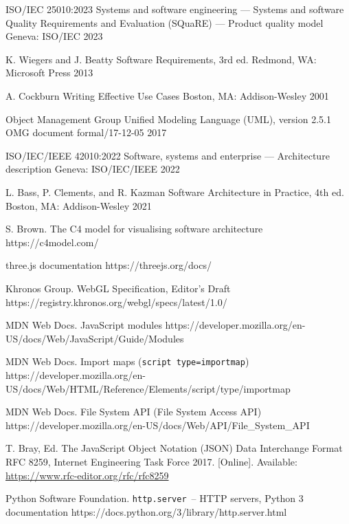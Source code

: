 \bibitemieee
{ISO/IEC 25010:2023}
{Systems and software engineering --- Systems and software Quality Requirements and Evaluation (SQuaRE) --- Product quality model}
{Geneva: ISO/IEC}
{2023}

\bibitemieee
{K. Wiegers and J. Beatty}
{Software Requirements, 3rd ed.}
{Redmond, WA: Microsoft Press}
{2013}

\bibitemieee
{A. Cockburn}
{Writing Effective Use Cases}
{Boston, MA: Addison-Wesley}
{2001}

\bibitemieee
{Object Management Group}
{Unified Modeling Language (UML), version 2.5.1}
{OMG document formal/17-12-05}
{2017}

\bibitemieee
{ISO/IEC/IEEE 42010:2022}
{Software, systems and enterprise --- Architecture description}
{Geneva: ISO/IEC/IEEE}
{2022}

\bibitemieee
{L. Bass, P. Clements, and R. Kazman}
{Software Architecture in Practice, 4th ed.}
{Boston, MA: Addison-Wesley}
{2021}

\bibitemweb
{S. Brown. The C4 model for visualising software architecture}
{https://c4model.com/}
{}

\bibitemweb
{three.js documentation}
{https://threejs.org/docs/}
{}

\bibitemweb
{Khronos Group. WebGL Specification, Editor's Draft}
{https://registry.khronos.org/webgl/specs/latest/1.0/}
{}

\bibitemweb
{MDN Web Docs. JavaScript modules}
{https://developer.mozilla.org/en-US/docs/Web/JavaScript/Guide/Modules}
{}

\bibitemweb
{MDN Web Docs. Import maps (\texttt{script type=importmap})}
{https://developer.mozilla.org/en-US/docs/Web/HTML/Reference/Elements/script/type/importmap}
{}

\bibitemweb
{MDN Web Docs. File System API (File System Access API)}
{https://developer.mozilla.org/en-US/docs/Web/API/File_System_API}
{}

\bibitemieee
{T. Bray, Ed.}
{The JavaScript Object Notation (JSON) Data Interchange Format}
{RFC 8259, Internet Engineering Task Force}
{2017. [Online]. Available: \url{https://www.rfc-editor.org/rfc/rfc8259}}

\bibitemweb
{Python Software Foundation. \texttt{http.server}~-- HTTP servers, Python 3 documentation}
{https://docs.python.org/3/library/http.server.html}
{}

\closeCustomBibliography
